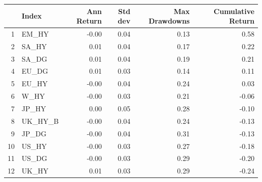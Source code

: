 \documentclass[11pt,preprint, authoryear]{elsarticle}
\let\origtable\table
\let\endorigtable\endtable
\renewenvironment{table}[1][2] {
    \expandafter\origtable\expandafter[H]
} {
    \endorigtable
}
\numberwithin{equation}{section}
\numberwithin{figure}{section}
\numberwithin{table}{section}
\begin{document}
\begin{table}[H]
\centering
\begin{tabular}{rlrrrr}
  \hline
 & Index & Ann Return & Std dev & Max Drawdowns & Cumulative Return \\ 
  \hline
1 & EM\_HY & -0.00 & 0.04 & 0.13 & 0.58 \\ 
  2 & SA\_HY & 0.01 & 0.04 & 0.17 & 0.22 \\ 
  3 & SA\_DG & 0.01 & 0.04 & 0.19 & 0.21 \\ 
  4 & EU\_DG & 0.01 & 0.03 & 0.14 & 0.11 \\ 
  5 & EU\_HY & -0.00 & 0.04 & 0.24 & 0.03 \\ 
  6 & W\_HY & -0.00 & 0.03 & 0.21 & -0.06 \\ 
  7 & JP\_HY & 0.00 & 0.05 & 0.28 & -0.10 \\ 
  8 & UK\_HY\_B & -0.00 & 0.04 & 0.24 & -0.13 \\ 
  9 & JP\_DG & -0.00 & 0.04 & 0.31 & -0.13 \\ 
  10 & US\_HY & -0.00 & 0.03 & 0.27 & -0.18 \\ 
  11 & US\_DG & -0.00 & 0.03 & 0.29 & -0.20 \\ 
  12 & UK\_HY & 0.01 & 0.03 & 0.29 & -0.24 \\ 
   \hline
\end{tabular}
\caption{Global Index  Portfolio Performance \label{tab1}} 
\end{table}
\end{document}

